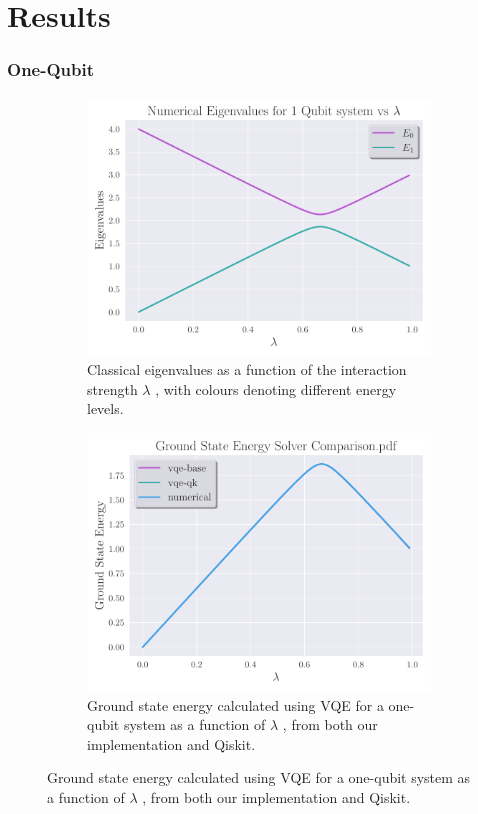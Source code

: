 \documentclass{beamer}
\begin{document}
\section{Results}
\begin{frame}[t]
	\frametitle{One-Qubit}

	\begin{figure}[ht]
		\centering
		\begin{subfigure}[b]{0.45\textwidth}
		\begin{center}
			\includegraphics[width=\textwidth]{../src/plots/eigs-1-cl.pdf}
		\end{center}
		\caption{Classical eigenvalues as a function of the interaction strength $ \lambda $ , with colours denoting different energy levels.}
		\label{fig:eig-1}
		\end{subfigure}
		\hfill
		\begin{subfigure}[b]{0.45\textwidth}
		\begin{center}
			\includegraphics[width=\textwidth]{../src/plots/1qb-al.pdf}	
		\end{center}
		\caption{Ground state energy calculated using VQE for a one-qubit system as a function of $ \lambda $ , from both our implementation and Qiskit.}
		\label{fig:1-qb-all}
		\end{subfigure}
		\label{fig:1-qb}
	\end{figure}
	

\end{frame}
\end{document}
